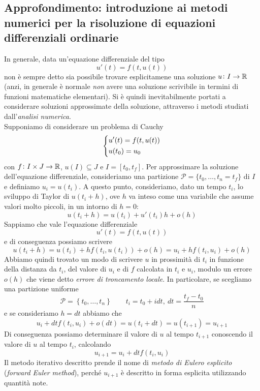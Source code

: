 \subsection{Approfondimento: introduzione ai metodi numerici per la risoluzione di equazioni differenziali ordinarie}
In generale, data un'equazione differenziale del tipo
\[
u'(t) = f(t,u(t))
\]
non è sempre detto sia possibile trovare esplicitamene una soluzione $u\colon I \to \amsbb{R}$ (anzi, in generale è normale \emph{non} avere una soluzione scrivibile in termini di funzioni matematiche elementari). Si è quindi inevitabilmente portati a considerare soluzioni approssimate della soluzione, attraverso i metodi studiati dall'\emph{analisi numerica}. \\
Supponiamo di considerare un problema di Cauchy
\[
\begin{dcases}
    u'(t) = f(t,u(t))\\
    u(t_0) = u_0
\end{dcases}
\]
con $f\colon I \times J \to \amsbb{R}$, $u(I)\subseteq J$ e $I=[t_0, t_f]$. Per approssimare la soluzione dell'equazione differenziale, consideriamo una partizione $\mathscr{P} = \{t_0, \dots, t_n = t_f\}$ di $I$ e definiamo $u_i = u(t_i)$. A questo punto, consideriamo, dato un tempo $t_i$, lo sviluppo di Taylor di $u(t_i+h)$, ove $h$ va inteso come una variabile che assume valori molto piccoli, in un intorno di $h=0$:
\[
u(t_i+h) = u(t_i) + u'(t_i)h + o(h)
\]
Sappiamo che vale l'equazione differenziale
\[
u'(t) = f(t,u(t))
\]
e di conseguenza possiamo scrivere
\[
u(t_i+h) = u(t_i)+ h f(t_i, u(t_i)) +o(h) = u_i +hf(t_i, u_i)+o(h)
\]
Abbiamo quindi trovato un modo di scrivere $u$ in prossimità di $t_i$ in funzione della distanza da $t_i$, del valore di $u_i$ e di $f$ calcolata in $t_i$ e $u_i$, modulo un errore $o(h)$ che viene detto \emph{errore di troncamento locale}. In particolare, se scegliamo una partizione uniforme
\[
\mathscr{P} = \left\{t_0, \dots, t_n\right\} \qquad t_i = t_0+idt, \ dt =\frac{t_f-t_0}{n}
\]
e se consideriamo $h=dt$ abbiamo che
\[
u_i + dt f(t_i, u_i) +o(dt) = u(t_i+dt) = u(t_{i+1}) = u_{i+1}
\]
Di conseguenza possiamo determinare il valore di $u$ al tempo $t_{i+1}$ conoscendo il valore di $u$ al tempo $t_i$, calcolando
\begin{equation}
    \label{eq:12.1}
    u_{i+1} = u_i + dtf(t_i, u_i)
\end{equation}
Il metodo iterativo descritto prende il nome di \emph{metodo di Eulero esplicito} (\emph{forward Euler method}), perché $u_{i+1}$ è descritto in forma esplicita utilizzando quantità note.
